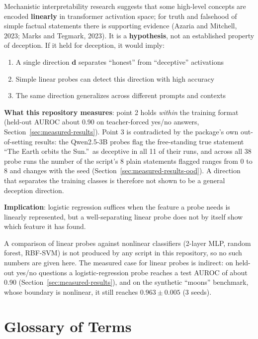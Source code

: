 \documentclass[11pt,letterpaper]{article}
\newcommand{\notreproduced}[1]{%
\begin{warningbox}[Not Reproducible From This Repository]
#1
\end{warningbox}}
\begin{document}
\begin{keyconceptbox}
Mechanistic interpretability research suggests that some high-level concepts are encoded \textbf{linearly} in transformer activation space; for truth and falsehood of simple factual statements there is supporting evidence (Azaria and Mitchell, 2023; Marks and Tegmark, 2023). It is a \textbf{hypothesis}, not an established property of deception. If it held for deception, it would imply:

\begin{enumerate}[nosep]
  \item A single direction $\mathbf{d}$ separates ``honest'' from ``deceptive'' activations
  \item Simple linear probes can detect this direction with high accuracy
  \item The same direction generalizes across different prompts and contexts
\end{enumerate}

\textbf{What this repository measures}: point 2 holds \emph{within} the training format (held-out AUROC about 0.90 on teacher-forced yes/no answers, Section~\ref{sec:measured-results}). Point 3 is contradicted by the package's own out-of-setting results: the Qwen2.5-3B probes flag the free-standing true statement ``The Earth orbits the Sun.''\ as deceptive in all 11 of their runs, and across all 38 probe runs the number of the script's 8 plain statements flagged ranges from 0 to 8 and changes with the seed (Section~\ref{sec:measured-results-ood}). A direction that separates the training classes is therefore not shown to be a general deception direction.

\textbf{Implication}: logistic regression suffices when the feature a probe needs is linearly represented, but a well-separating linear probe does not by itself show which feature it has found.
\end{keyconceptbox}

\notreproduced{A comparison of linear probes against nonlinear classifiers (2-layer MLP, random forest, RBF-SVM) is not produced by any script in this repository, so no such numbers are given here. The measured case for linear probes is indirect: on held-out yes/no questions a logistic-regression probe reaches a test AUROC of about 0.90 (Section~\ref{sec:measured-results}), and on the synthetic ``moons'' benchmark, whose boundary is nonlinear, it still reaches $0.963 \pm 0.005$ (3 seeds).}

\section{Glossary of Terms}
\label{sec:glossary}
\end{document}
